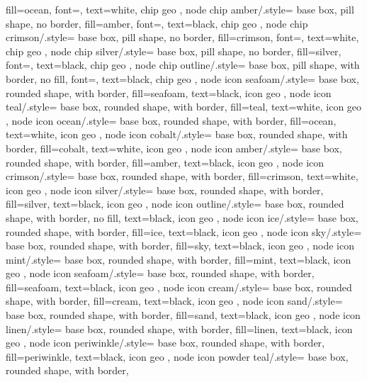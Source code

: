 {{		fill=ocean, font=\footnotesize\sffamily,
		text=white, chip geo
	},
	node chip amber/.style={
		base box, pill shape, no border,
		fill=amber, font=\footnotesize\sffamily,
		text=black, chip geo
	},
	node chip crimson/.style={
		base box, pill shape, no border,
		fill=crimson, font=\footnotesize\sffamily,
		text=white, chip geo
	},
	node chip silver/.style={
		base box, pill shape, no border,
		fill=silver, font=\footnotesize\sffamily,
		text=black, chip geo
	},
	node chip outline/.style={
		base box, pill shape, with border,
		no fill, font=\footnotesize\sffamily,
		text=black, chip geo
	},
	node icon seafoam/.style={
		base box, rounded shape, with border,
		fill=seafoam, text=black, icon geo
	},
	node icon teal/.style={
		base box, rounded shape, with border,
		fill=teal, text=white, icon geo
	},
	node icon ocean/.style={
		base box, rounded shape, with border,
		fill=ocean, text=white, icon geo
	},
	node icon cobalt/.style={
		base box, rounded shape, with border,
		fill=cobalt, text=white, icon geo
	},
	node icon amber/.style={
		base box, rounded shape, with border,
		fill=amber, text=black, icon geo
	},
	node icon crimson/.style={
		base box, rounded shape, with border,
		fill=crimson, text=white, icon geo
	},
	node icon silver/.style={
		base box, rounded shape, with border,
		fill=silver, text=black, icon geo
	},
	node icon outline/.style={
		base box, rounded shape, with border,
		no fill, text=black, icon geo
	},
	node icon ice/.style={
		base box, rounded shape, with border,
		fill=ice, text=black, icon geo
	},
	node icon sky/.style={
		base box, rounded shape, with border,
		fill=sky, text=black, icon geo
	},
	node icon mint/.style={
		base box, rounded shape, with border,
		fill=mint, text=black, icon geo
	},
	node icon seafoam/.style={
		base box, rounded shape, with border,
		fill=seafoam, text=black, icon geo
	},
	node icon cream/.style={
		base box, rounded shape, with border,
		fill=cream, text=black, icon geo
	},
	node icon sand/.style={
		base box, rounded shape, with border,
		fill=sand, text=black, icon geo
	},
	node icon linen/.style={
		base box, rounded shape, with border,
		fill=linen, text=black, icon geo
	},
	node icon periwinkle/.style={
		base box, rounded shape, with border,
		fill=periwinkle, text=black, icon geo
	},
	node icon powder teal/.style={
		base box, rounded shape, with border,
}}
